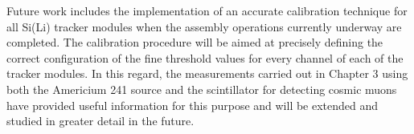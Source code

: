 \par
Future work includes the implementation of an accurate calibration technique for all Si(Li) tracker modules when the assembly operations currently underway are completed.  The calibration procedure will be aimed at precisely defining the correct configuration of the fine threshold values for every channel of each of the tracker modules. In this regard, the measurements carried out in Chapter 3 using both the Americium 241 source and the scintillator for detecting cosmic muons have provided useful information for this purpose and will be extended and studied in greater detail in the future.